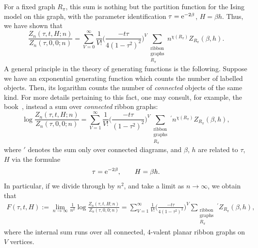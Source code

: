 \documentclass[pdftex]{sigma}
\numberwithin{equation}{section}
\begin{document}
For a fixed graph $R_{\pi}$, this sum is nothing but the partition function for the Ising model on this graph, with the parameter identification
$\tau = {\rm e}^{-2\beta}$, $H = \beta h$. Thus, we have shown that
 \begin{equation*}
 \frac{Z_n(\tau,t,H;n)}{Z_n(\tau,0,0;n)} = \sum_{V = 0}^{\infty}\frac{1}{V!} \biggl(\frac{-t\tau}{4(1-\tau^2)^2}\biggr)^V\sum_{\substack{\text{ribbon}\\\text{graphs}\\ R_{\pi} }} n^{\chi(R_{\pi})} Z_{R_{\pi}}(\beta,h).
 \end{equation*}
A general principle in the theory of generating functions is the following. Suppose we have an exponential generating function which counts the number of labelled objects. Then, its logarithm counts the number of \textit{connected} objects of the same kind. For more details pertaining to this fact, one may consult, for example, the book~\cite[Section~5]{Stanley}, instead a sum over \textit{connected} ribbon graphs:
 \begin{equation*}
 \log \frac{Z_n(\tau,t,H;n)}{Z_n(\tau,0,0;n)} = \sum_{V = 1}^{\infty}\frac{1}{V!}\biggl(\frac{-t\tau}{(1-\tau^2)^2}\biggr)^V\sum_{\substack{\text{ribbon}\\\text{graphs}\\ R_{\pi} }} {}^{'} n^{\chi(R_{\pi})} Z_{R_{\pi}}(\beta,h),
 \end{equation*}
where $'$ denotes the sum only over connected diagrams, and $\beta$, $h$ are related to $\tau$, $H$ via the formulae
 \begin{equation*}
 \tau = {\rm e}^{-2\beta}, \qquad H = \beta h.
 \end{equation*}
In particular, if we divide through by $n^2$, and take a limit as $n\to \infty$, we obtain that
 \begin{gather}\label{generating-function-genus-0}
 F(\tau,t,H) := \lim_{n\to\infty} \frac{1}{n^2}\log \frac{Z_n(\tau,t,H;n)}{Z_n(\tau,0,0;n)} = \sum_{V = 1}^{\infty}\frac{1}{V!} \biggl(\frac{-t\tau}{4(1-\tau^2)^2}\biggr)^V\sum_{\substack{\text{ribbon}\\\text{graphs}\\ R_{\pi} }} {}^{'} Z_{R_{\pi}}(\beta,h),
 \end{gather}
where the internal sum runs over all connected, $4$-valent planar ribbon graphs on $V$ vertices.
\end{document}

